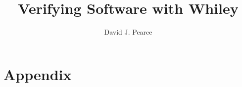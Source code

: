 \documentclass{article}
\title{\Huge Verifying Software with Whiley}
\author{David J. Pearce}
\begin{document}
\maketitle

\tableofcontents
\clearpage






\appendix
\newpage
\section*{Appendix}



\end{document}
